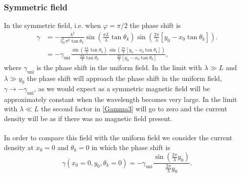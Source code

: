 \subsubsection{Symmetric field}
In the  symmetric field, i.e. when $\varphi =\pi/2$ the phase shift is
\begin{equation}
\begin{split}
    \gamma &= -\frac{\lambda^2}{l_m^2\pi^2\tan\theta_k}\sin\left(\frac{\pi L}{\lambda}\tan\theta_k\right)\sin\left(\frac{2\pi}{\lambda}\left[y_0-x_0\tan\theta_k\right]\right). 
    \\
    &= -\gamma_{\mathrm{uni}}\frac{\sin\left(\frac{\pi L}{\lambda}\tan\theta_k\right)}{\frac{\pi L}{\lambda}\tan\theta_k}\frac{\sin\left(\frac{2\pi}{\lambda}\left[y_0-x_0\tan\theta_k\right]\right)}{\frac{2\pi}{\lambda}\left[y_0-x_0\tan\theta_k\right]},
\end{split}
\label{Gamma3}
\end{equation}
where $\gamma_{\mathrm{uni}}$ is the phase shift in the uniform field. In the limit with $\lambda \gg L$ and $\lambda \gg y_0$ the phase shift will approach the phase shift in the uniform field, $\gamma \rightarrow -\gamma_{\mathrm{uni}}$, as we would expect as a symmetric magnetic field will be approximately constant when the wavelength becomes very large. In the limit with $\lambda \ll L$ the second factor in \eqref{Gamma3} will go to zero and the current density will be as if there was no magnetic field present. 
\\
\\
In order to compare this field with the uniform field we consider the current density at $x_0=0$ and $\theta_k = 0$ in which the phase shift is
\begin{equation}
    \gamma(x_0=0,y_0,\theta_k=0) = -\gamma_{\mathrm{uni}}\frac{\sin\left(\frac{2\pi}{\lambda}y_0\right)}{\frac{2\pi}{\lambda}y_0}.
\end{equation}
